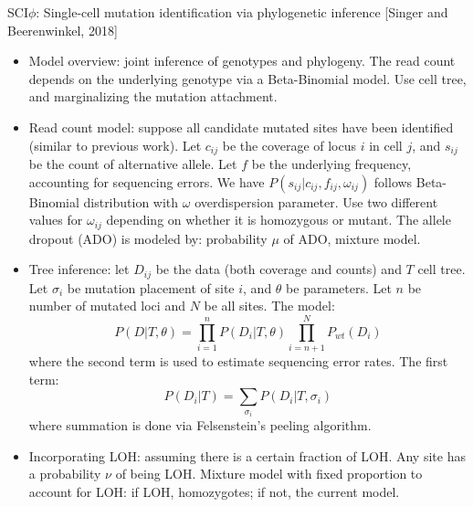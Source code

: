 \documentclass{report}
\begin{document}
SCI$\phi$: Single-cell mutation identification via phylogenetic inference [Singer and Beerenwinkel, 2018]
\begin{itemize}
	\item Model overview: joint inference of genotypes and phylogeny. The read count depends on the underlying genotype via a Beta-Binomial model. Use cell tree, and marginalizing the mutation attachment. 
	
	\item Read count model: suppose all candidate mutated sites have been identified (similar to previous work). Let $c_{ij}$ be the coverage of locus $i$ in cell $j$, and $s_{ij}$ be the count of alternative allele. Let $f$ be the underlying frequency, accounting for sequencing errors. We have $P(s_{ij}|c_{ij}, f_{ij}, \omega_{ij})$ follows Beta-Binomial distribution with $\omega$ overdispersion parameter. Use two different values for $\omega_{ij}$ depending on whether it is homozygous or mutant. The allele dropout (ADO) is modeled by: probability $\mu$ of ADO, mixture model. 
	
	\item Tree inference: let $D_{ij}$ be the data (both coverage and counts) and $T$ cell tree. Let $\sigma_i$ be mutation placement of site $i$, and $\theta$ be parameters. Let $n$ be number of mutated loci and $N$ be all sites. The model: 
	\begin{equation}
	P(D|T, \theta) = \prod_{i=1}^n P(D_i|T, \theta) \prod_{i={n+1}}^N P_{wt}(D_i)
	\end{equation}
	where the second term is used to estimate sequencing error rates. The first term: 
	\begin{equation}
	P(D_i|T) = \sum_{\sigma_i} P(D_i | T, \sigma_i)
	\end{equation}
	where summation is done via Felsenstein's peeling algorithm. 
	
	\item Incorporating LOH: assuming there is a certain fraction of LOH. Any site has a probability $\nu$ of being LOH. Mixture model with fixed proportion to account for LOH: if LOH, homozygotes; if not, the current model. 
\end{itemize}
\end{document}

